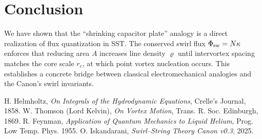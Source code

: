 \documentclass[11pt,a4paper]{article}
\begin{document}
\section{Conclusion}
    We have shown that the ``shrinking capacitor plate'' analogy is a direct realization of flux quantization in SST. The conserved swirl flux $\Phi_{\rm sw}=N\kappa$ enforces that reducing area $A$ increases line density $\bm{\varrho}$ until intervortex spacing matches the core scale $r_c$, at which point vortex nucleation occurs. This establishes a concrete bridge between classical electromechanical analogies and the Canon's swirl invariants.

    
    \begin{thebibliography}{9}
     H. Helmholtz, \emph{On Integrals of the Hydrodynamic Equations}, Crelle’s Journal, 1858.
     W. Thomson (Lord Kelvin), \emph{On Vortex Motion}, Trans. R. Soc. Edinburgh, 1869.
     R. Feynman, \emph{Application of Quantum Mechanics to Liquid Helium}, Prog. Low Temp. Phys. 1955.
     O. Iskandarani, \emph{Swirl--String Theory Canon v0.3}, 2025.
    \end{thebibliography}
\end{document}
